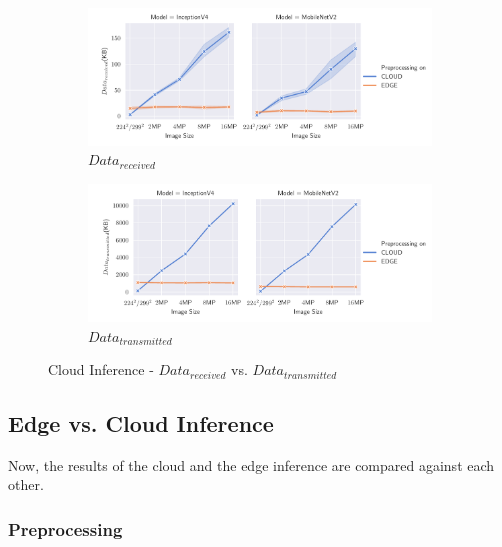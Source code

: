 \begin{figure}[H]
\centering
\begin{subfigure}[b]{0.95\textwidth}
   \includegraphics[width=1\linewidth]{./Bilder/single_plots/cloud_inference_plots/Cloud_Inference_Received_Data.pdf}
   \caption{$Data_{received}$}
   \label{fig:CloudInferenceReceivedData} 
\end{subfigure}

\begin{subfigure}[b]{0.95\textwidth}
   \includegraphics[width=1\linewidth]{./Bilder/single_plots/cloud_inference_plots/Cloud_Inference_Transmitted_Data.pdf}
   \caption{$Data_{transmitted}$}
   \label{fig:CloudInferenceTransmittedData}
\end{subfigure}

\caption{Cloud Inference -  $Data_{received}$ vs. $Data_{transmitted}$}
\end{figure}


\subsection{Edge vs. Cloud Inference}
Now, the results of the cloud and the edge inference are compared against each other.
\subsubsection{Preprocessing}


